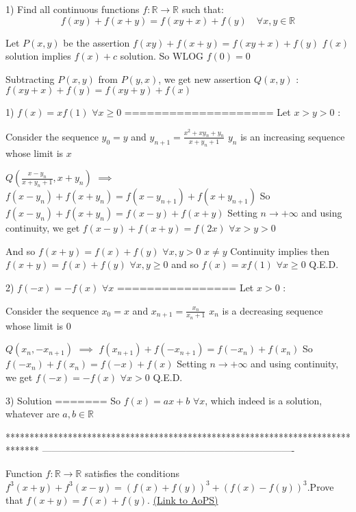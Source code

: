\begin{solution}
	\begin{tcolorbox}1) Find all continuous functions $f:\mathbb{R}\to \mathbb{R}$ such that:
\[f(xy)+f(x+y)=f(xy+x)+f(y)\quad \forall x,y\in \mathbb{R}\]\end{tcolorbox}
Let $P(x,y)$ be the assertion $f(xy)+f(x+y)=f(xy+x)+f(y)$
$f(x)$ solution implies $f(x)+c$ solution. So WLOG $f(0)=0$

Subtracting $P(x,y)$ from $P(y,x)$, we get new assertion $Q(x,y)$ : $f(xy+x)+f(y)=f(xy+y)+f(x)$

1) $f(x)=xf(1)$ $\forall x\ge 0$
====================
Let $x>y>0$ :

Consider the sequence $y_0=y$ and $y_{n+1}=\frac{x^2+xy_n+y_n}{x+y_n+1}$
$y_n$ is an increasing sequence whose limit is $x$

$Q(\frac{x-y_n}{x+y_n+1},x+y_n)$ $\implies$ $f(x-y_n)+f(x+y_n)=f(x-y_{n+1})+f(x+y_{n+1})$
So $f(x-y_n)+f(x+y_n)=f(x-y)+f(x+y)$
Setting $n\to+\infty$ and using continuity, we get $f(x-y)+f(x+y)=f(2x)$ $\forall x>y>0$

And so $f(x+y)=f(x)+f(y)$ $\forall x,y>0$ $x\ne y$
Continuity implies then $f(x+y)=f(x)+f(y)$ $\forall x,y\ge 0$ and so $f(x)=xf(1)$ $\forall x\ge 0$
Q.E.D.

2) $f(-x)=-f(x)$ $\forall x$
================
Let $x>0$ : 

Consider the sequence $x_0=x$ and $x_{n+1}=\frac{x_n}{x_n+1}$
$x_n$ is a decreasing sequence whose limit is $0$

$Q(x_n,-x_{n+1})$ $\implies$ $f(x_{n+1})+f(-x_{n+1})=f(-x_n)+f(x_n)$
So $f(-x_n)+f(x_n)=f(-x)+f(x)$
Setting $n\to+\infty$ and using continuity, we get $f(-x)=-f(x)$ $\forall x>0$
Q.E.D.

3) Solution
=======
So $\boxed{f(x)=ax+b}$ $\forall x$, which indeed is a solution, whatever are $a,b\in\mathbb R$
\end{solution}
*******************************************************************************
-------------------------------------------------------------------------------

\begin{problem}
	Function $f: \mathbb{R}\to\mathbb{R}$ satisfies the conditions $f^3(x+y)+f^3(x-y)=(f(x)+f(y))^3+(f(x)-f(y))^3$.Prove that $f(x+y)=f(x)+f(y)$.
	\flushright \href{https://artofproblemsolving.com/community/c6h567464}{(Link to AoPS)}
\end{problem}



